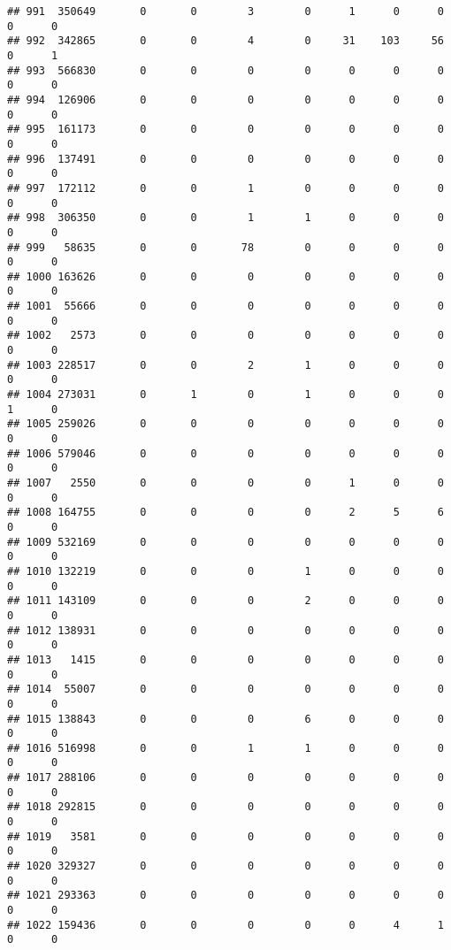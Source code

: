 \documentclass[
]{article}
\begin{document}
\begin{verbatim}
## 991  350649       0       0        3        0      1      0      0     0      0
## 992  342865       0       0        4        0     31    103     56     0      1
## 993  566830       0       0        0        0      0      0      0     0      0
## 994  126906       0       0        0        0      0      0      0     0      0
## 995  161173       0       0        0        0      0      0      0     0      0
## 996  137491       0       0        0        0      0      0      0     0      0
## 997  172112       0       0        1        0      0      0      0     0      0
## 998  306350       0       0        1        1      0      0      0     0      0
## 999   58635       0       0       78        0      0      0      0     0      0
## 1000 163626       0       0        0        0      0      0      0     0      0
## 1001  55666       0       0        0        0      0      0      0     0      0
## 1002   2573       0       0        0        0      0      0      0     0      0
## 1003 228517       0       0        2        1      0      0      0     0      0
## 1004 273031       0       1        0        1      0      0      0     1      0
## 1005 259026       0       0        0        0      0      0      0     0      0
## 1006 579046       0       0        0        0      0      0      0     0      0
## 1007   2550       0       0        0        0      1      0      0     0      0
## 1008 164755       0       0        0        0      2      5      6     0      0
## 1009 532169       0       0        0        0      0      0      0     0      0
## 1010 132219       0       0        0        1      0      0      0     0      0
## 1011 143109       0       0        0        2      0      0      0     0      0
## 1012 138931       0       0        0        0      0      0      0     0      0
## 1013   1415       0       0        0        0      0      0      0     0      0
## 1014  55007       0       0        0        0      0      0      0     0      0
## 1015 138843       0       0        0        6      0      0      0     0      0
## 1016 516998       0       0        1        1      0      0      0     0      0
## 1017 288106       0       0        0        0      0      0      0     0      0
## 1018 292815       0       0        0        0      0      0      0     0      0
## 1019   3581       0       0        0        0      0      0      0     0      0
## 1020 329327       0       0        0        0      0      0      0     0      0
## 1021 293363       0       0        0        0      0      0      0     0      0
## 1022 159436       0       0        0        0      0      4      1     0      0

\end{verbatim}
\end{document}
